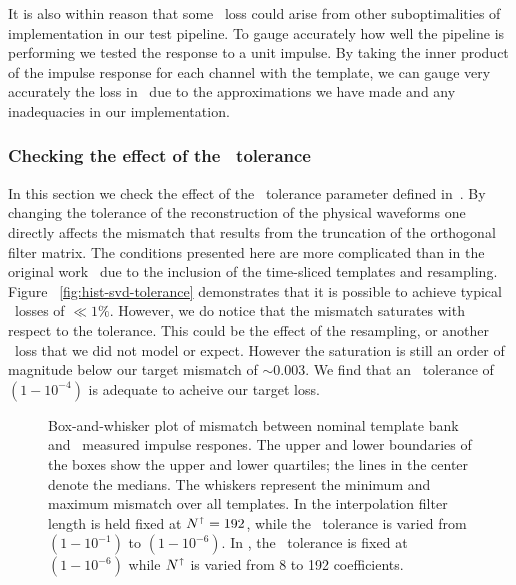 It is also within reason that some \SNR\ loss could arise from other
suboptimalities of implementation in our test pipeline.  To gauge
accurately how well the pipeline is performing we tested the response to a
unit impulse.  By taking the inner product of the impulse response for each channel
with the template, we can gauge very accurately the loss in
\SNR\ due to the approximations we have made and any inadequacies in
our implementation.

\subsubsection{Checking the effect of the \SVD\ tolerance}

In this section we check the effect of the \SVD\ tolerance parameter defined
in~\cite{Cannon:2010p10398}.  By changing the tolerance of the reconstruction
of the physical waveforms one directly affects the mismatch that results from
the truncation of the orthogonal filter matrix.  The conditions presented here
are more complicated than in the original work~\cite{Cannon:2010p10398} due to
the inclusion of the time-sliced templates and resampling.  Figure~%
\ref{fig:hist-svd-tolerance} demonstrates that it is possible to achieve
typical \SNR\ losses of $\ll1\%$.  However, we do notice that the mismatch
saturates with respect to the tolerance.  This could be the effect of the
resampling, or another \SNR\ loss that we did not model or expect.  However the
saturation is still an order of magnitude below our target mismatch of
$\sim$0.003.  We find that an \SVD\ tolerance of $\left(1-10^{-4}\right)$ is
adequate to acheive our target \SNR{} loss.
%
\begin{figure}
	\begin{center}
		\caption{Box-and-whisker plot of mismatch between nominal
template bank and \lloid\ measured impulse respones.  The upper and lower boundaries of
the boxes show the upper and lower quartiles; the lines in the center denote the medians.
The whiskers represent the minimum and maximum mismatch over all templates.  In 
 the interpolation filter length is held fixed
at $N^\shortuparrow = 192$, while the \SVD\ tolerance is varied from
$\left(1-10^{-1}\right)$ to $\left(1-10^{-6}\right)$.  In , the \SVD\ tolerance is fixed at $\left(1-10^{-6}\right)$ while $N^\shortuparrow$ is varied from 8 to 192 coefficients.}
	\end{center}
\end{figure}

